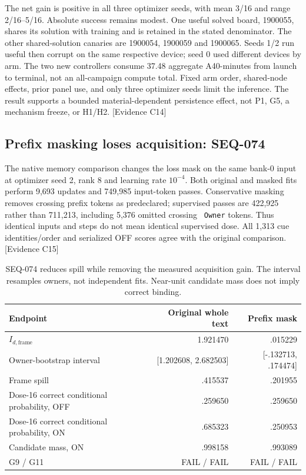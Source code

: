 \documentclass[11pt]{article}
\newcommand{\ev}[1]{\textsf{[Evidence #1]}}
\begin{document}
The net gain is positive in all three optimizer seeds, with mean 3/16 and range
2/16--5/16. Absolute success remains modest. One useful solved board, 1900055,
shares its solution with training and is retained in the stated denominator.
The other shared-solution canaries are 1900054, 1900059 and 1900065. Seeds 1/2
run useful then corrupt on the same respective device; seed 0 used different
devices by arm. The two new controllers consume 37.48 aggregate A40-minutes
from launch to terminal, not an all-campaign compute total. Fixed arm order,
shared-node effects, prior panel use, and only three optimizer seeds limit the
inference. The result supports a bounded material-dependent persistence effect,
not P1, G5, a mechanism freeze, or H1/H2. \ev{C14}

\subsection{Prefix masking loses acquisition: SEQ-074}
The native memory comparison changes the loss mask on the same bank-0 input
at optimizer seed 2, rank 8 and learning rate $10^{-4}$. Both original and
masked fits perform 9,693 updates and 749,985 input-token passes. Conservative
masking removes crossing prefix tokens as predeclared; supervised passes are
422,925 rather than 711,213, including 5,376 omitted crossing \texttt{ Owner}
tokens. Thus identical inputs and steps do not mean identical supervised dose.
All 1,313 cue identities/order and serialized OFF scores agree with the
original comparison. \ev{C15}

\begin{table}[htbp]
\centering\small
\begin{tabular}{lrr}
\toprule
Endpoint & Original whole text & Prefix mask \\
\midrule
$I_{d,\mathrm{frame}}$ & 1.921470 & .015229 \\
Owner-bootstrap interval & [1.202608, 2.682503] & [-.132713, .174474] \\
Frame spill & .415537 & .201955 \\
Dose-16 correct conditional probability, OFF & .259650 & .259650 \\
Dose-16 correct conditional probability, ON & .685323 & .250953 \\
Candidate mass, ON & .998158 & .993089 \\
G9 / G11 & FAIL / FAIL & FAIL / FAIL \\
\bottomrule
\end{tabular}
\caption{SEQ-074 reduces spill while removing the measured acquisition gain.
The interval resamples owners, not independent fits. Near-unit candidate mass
does not imply correct binding.}
\label{tab:mask}
\end{table}
\end{document}
